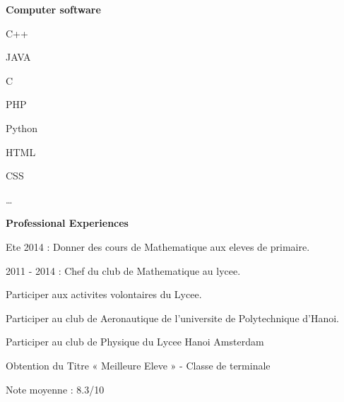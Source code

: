 \documentclass[a4paper,12pt,final]{memoir}
\newcommand{\Sep}{\vspace{1.5em}}
\newcommand{\SmallSep}{\vspace{0.5em}}
\newcommand{\CVSection}[1]
	{\Large\textbf{#1}\par
	\SmallSep\normalsize\normalfont}
\newcommand{\CVItem}[1]
	{\textbf{\color{RoyalBlue} #1}}
\begin{document}
\CVItem{Computer software}
\begin{multicols}{3}
\begin{compactitem}[\color{RoyalBlue}$\circ$]
	\item C++ 
	\item JAVA 
	\item C 
	\item PHP 
	\item Python
	\item HTML 
	\item CSS 
	\item \ldots
\end{compactitem}
\end{multicols}
\Sep 

\CVSection{Professional Experiences}
Ete 2014 : Donner des cours de Mathematique aux eleves de primaire.

2011 - 2014 : Chef du club de Mathematique au lycee.

Participer aux activites volontaires du Lycee.

Participer au club de Aeronautique de l'universite de Polytechnique d'Hanoi.

Participer au club de Physique du Lycee Hanoi Amsterdam

Obtention du Titre « Meilleure Eleve » - Classe de terminale 

Note moyenne : 8.3/10

\clearpage
\framebreak
\framebreak



\end{document}
